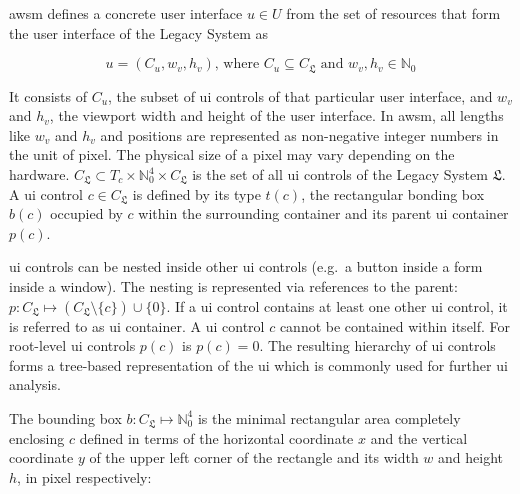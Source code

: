 \gls{awsm} defines a concrete  user interface \(u \in U\) from the 
set of resources that form the user interface of the \gls{Legacy System} as

\begin{equation}u = (C_u, w_v, h_v) \textrm{, where } C_u \subseteq C_{\mathfrak{L}} \textrm{ and } w_v, h_v \in \mathbb{N}_0\label{eq:ui}\end{equation}

It consists of \(C_u \), the subset of \gls{ui} controls of that particular user interface, and \(w_v\) and \(h_v\), the viewport width and height of the user interface.
In \gls{awsm}, all lengths like \(w_v\) and \(h_v\) and positions are represented as non-negative integer numbers in the unit of pixel.
%
The physical size of a pixel may vary depending on the hardware.
\(C_{\mathfrak{L}} \subset T_c \times \mathbb{N}_0^4 \times C_{\mathfrak{L}}\) is the set of all \gls{ui} controls of the \gls{Legacy System} \(\mathfrak{L}\).
A \gls{ui} control \(c \in C_{\mathfrak{L}}\) is defined by its type \(t(c)\), the rectangular bonding box \(b(c)\) occupied by \(c\) within the surrounding container and its parent \gls{ui} container \(p(c)\).

\gls{ui} controls can be nested inside other \gls{ui} controls (e.g.~a button inside a form inside a window).
The nesting is represented via references to the parent: \(p: C_{\mathfrak{L}} \mapsto (C_{\mathfrak{L}} \setminus \{c\}) \cup \{0\}\).
If a \gls{ui} control contains at least one other \gls{ui} control, it is referred to as \gls{ui} container.
A \gls{ui} control \(c\) cannot be contained within itself. %
For root-level \gls{ui} controls \(p(c)\) is \(p(c) = 0\).
The resulting hierarchy of \gls{ui} controls forms a tree-based representation of the \gls{ui} which is commonly used for further \gls{ui} analysis.

The bounding box \(b: C_{\mathfrak{L}} \mapsto \mathbb{N}_0^4\) is the minimal rectangular area completely enclosing \(c\) defined in terms of the horizontal coordinate \(x\) and the vertical coordinate \(y\) of the upper left corner of the rectangle and its width \(w\) and height \(h\), in pixel respectively:

